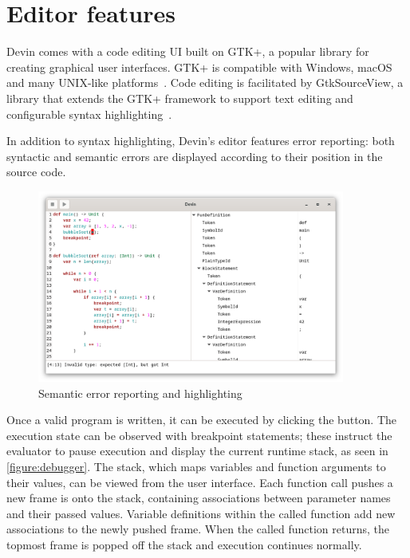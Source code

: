 \documentclass[UdineBachThesis,american,11pt]{PhdThesis}
\begin{document}
  \section{Editor features}
  \label{section:editor-features}

  Devin comes with a code editing UI built on GTK+, a popular library for
  creating graphical user interfaces. GTK+ is compatible with Windows, macOS and
  many UNIX-like platforms~\cite{gtk+}. Code editing is facilitated by
  GtkSourceView, a library that extends the GTK+ framework to support text
  editing and configurable syntax highlighting~\cite{gtksourceview}.

  In addition to syntax highlighting, Devin's editor features error reporting:
  both syntactic and semantic errors are displayed according to their position
  in the source code.

  \begin{figure}[H]
    \centering
    \includegraphics[width=0.9\textwidth]{4.png}
    \caption{Semantic error reporting and highlighting}
  \end{figure}

  \pagebreak

  Once a valid program is written, it can be executed by clicking the
  {\blacktriangleright} button. The execution state can be observed with
  breakpoint statements; these instruct the evaluator to pause execution and
  display the current runtime stack, as seen in \autoref{figure:debugger}. The
  stack, which maps variables and function arguments to their values, can be
  viewed from the user interface. Each function call pushes a new frame is onto
  the stack, containing associations between parameter names and their passed
  values. Variable definitions within the called function add new associations
  to the newly pushed frame. When the called function returns, the topmost frame
  is popped off the stack and execution continues normally.
\end{document}

